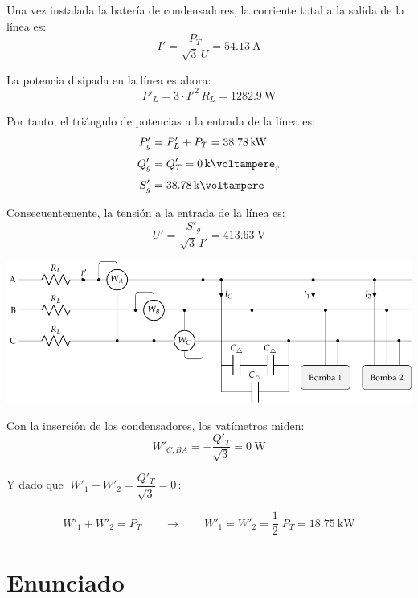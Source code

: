 Una vez instalada la batería de condensadores, la corriente total a la salida de la línea es:
\[
I' = \frac{P_T}{\sqrt{3} \, U} = \SI{54.13}{\ampere}
\]

La potencia disipada en la línea es ahora:
\[
P'_L = 3 \cdot I'^2 \, R_L = \SI{1282.9}{\watt} 
\]

Por tanto, el triángulo de potencias a la entrada de la línea es:
\begin{align*}
P'_g &= P'_L + P_T = \SI{38.78}{\kilo\watt}\\[3pt]
Q'_g &= Q'_T = \SI{0}{\kilo\voltampere}_r\\[3pt]
S'_g &= \SI{38.78}{\kilo\voltampere}
\end{align*}

Consecuentemente, la tensión a la entrada de la línea es:
\[
U' = \frac{S'_g}{\sqrt{3} \, I'} = \SI{413.63}{\volt}
\]

\begin{center}
    \includegraphics[width=1\textwidth]{figuras/BT3_ej5_bombas_condensadores_vat.pdf}
\end{center}

\vspace{2mm}
Con la inserción de los condensadores, los vatímetros miden:
\[
    W'_{C, BA} = - \frac{Q'_T}{\sqrt{3}} = \SI{0}{\watt}
\]

\vspace{-2mm}
Y dado que $\; W'_1 - W'_2 = \dfrac{Q'_T}{\sqrt{3}} = 0 \,$:

\vspace{2mm}
\[
    W'_1 + W'_2 = P_T 
    \qquad \rightarrow \qquad    
    W'_1 = W'_2 = \frac{1}{2} \; P_T = \SI{18.75}{\kilo\watt}
\]



\section{Enunciado}

